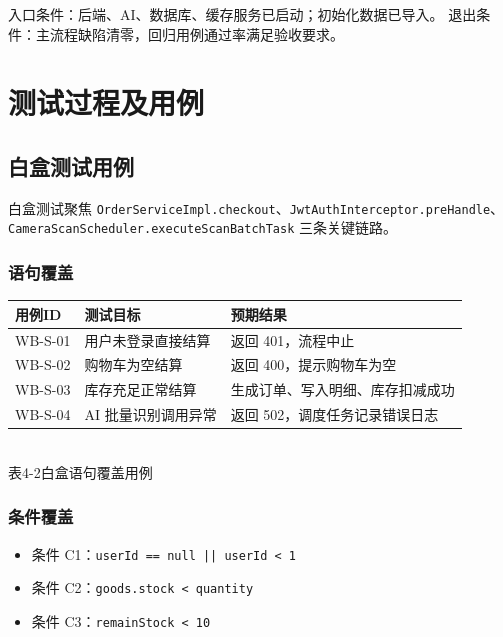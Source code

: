 入口条件：后端、AI、数据库、缓存服务已启动；初始化数据已导入。  
退出条件：主流程缺陷清零，回归用例通过率满足验收要求。

\section{测试过程及用例}

\subsection{白盒测试用例}
白盒测试聚焦 \texttt{OrderServiceImpl.checkout}、\texttt{JwtAuthInterceptor.preHandle}、\texttt{CameraScanScheduler.executeScanBatchTask} 三条关键链路。

\subsubsection{语句覆盖}
\begin{center}
  \renewcommand{\arraystretch}{1.35}
  \begin{tabular}{|>{\centering\arraybackslash}m{1.8cm}|>{\centering\arraybackslash}m{4.0cm}|>{\centering\arraybackslash}m{5.8cm}|}
    \hline
    \textbf{用例ID} & \textbf{测试目标} & \textbf{预期结果} \\ \hline
    WB-S-01 & 用户未登录直接结算 & 返回 401，流程中止 \\ \hline
    WB-S-02 & 购物车为空结算 & 返回 400，提示购物车为空 \\ \hline
    WB-S-03 & 库存充足正常结算 & 生成订单、写入明细、库存扣减成功 \\ \hline
    WB-S-04 & AI 批量识别调用异常 & 返回 502，调度任务记录错误日志 \\ \hline
  \end{tabular}
  \\[0.3em]
  {表4-2\quad 白盒语句覆盖用例}
\end{center}

\subsubsection{条件覆盖}
\begin{itemize}[leftmargin=2em]
  \item 条件 C1：\texttt{userId == null || userId < 1}
  \item 条件 C2：\texttt{goods.stock < quantity}
  \item 条件 C3：\texttt{remainStock < 10}
\end{itemize}

